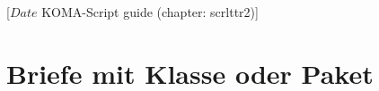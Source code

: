 %
%
%
%
%
%
%
%
% 
%
%
%
%

%
                 [$Date$
                  KOMA-Script guide (chapter: scrlttr2)]

\chapter{Briefe mit Klasse  oder Paket }

\BeginIndexGroup
{}%
%
\iffalse%
Briefe sind in vielerlei Hinsicht etwas ganz anderes als Artikel, Berichte,
Bücher oder Ähnliches. Schon allein deshalb gibt es für Briefe ein eigenes
Kapitel.%
\iffalse%
Aber auch aus weiteren Gründen ist ein eigenes Kapitel für
\Class{scrlttr2} und \Package{scrletter} gerechtfertigt.%
\fi%
\fi%

